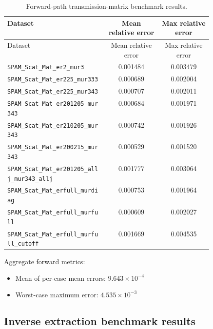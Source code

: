 \documentclass[11pt]{article}
\begin{document}
\begin{longtable}{>{\raggedright\arraybackslash}p{0.49\linewidth} S[table-format=1.6] S[table-format=1.6]}
\caption{Forward-path transmission-matrix benchmark results.} \label{tab:forward-results} \\
\toprule
Dataset & {Mean relative error} & {Max relative error} \\
\midrule
\endfirsthead
\toprule
Dataset & {Mean relative error} & {Max relative error} \\
\midrule
\endhead
\texttt{SPAM\_Scat\_Mat\_er2\_mur3} & 0.001484 & 0.003479 \\
\texttt{SPAM\_Scat\_Mat\_er225\_mur333} & 0.000689 & 0.002004 \\
\texttt{SPAM\_Scat\_Mat\_er225\_mur343} & 0.000707 & 0.002011 \\
\texttt{SPAM\_Scat\_Mat\_er201205\_mur343} & 0.000684 & 0.001971 \\
\texttt{SPAM\_Scat\_Mat\_er210205\_mur343} & 0.000742 & 0.001926 \\
\texttt{SPAM\_Scat\_Mat\_er200215\_mur343} & 0.000529 & 0.001520 \\
\texttt{SPAM\_Scat\_Mat\_er201205\_allj\_mur343\_allj} & 0.001777 & 0.003064 \\
\texttt{SPAM\_Scat\_Mat\_erfull\_murdiag} & 0.000753 & 0.001964 \\
\texttt{SPAM\_Scat\_Mat\_erfull\_murfull} & 0.000609 & 0.002027 \\
\texttt{SPAM\_Scat\_Mat\_erfull\_murfull\_cutoff} & 0.001669 & 0.004535 \\
\bottomrule
\end{longtable}

Aggregate forward metrics:
\begin{itemize}
    \item Mean of per-case mean errors: \(9.643\times 10^{-4}\)
    \item Worst-case maximum error: \(4.535\times 10^{-3}\)
\end{itemize}

\subsection{Inverse extraction benchmark results}
\end{document}
